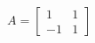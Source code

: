 \documentclass[preview]{standalone}
\begin{document}
\begin{center}
$\displaystyle A=\left[\begin{matrix}1 & 1\\-1 & 1\end{matrix}\right]$
\end{center}
\end{document}
